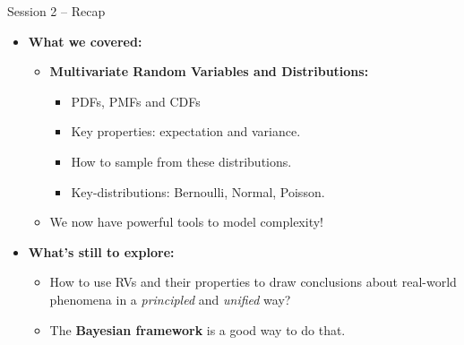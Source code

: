 \documentclass{beamer}
\begin{document}
\begin{frame}{Session 2 – Recap}
  \begin{itemize}
    \item \textbf{What we covered:}
    \begin{itemize}
      \item \textbf{Multivariate Random Variables and Distributions:}
      \begin{itemize}
        \item PDFs, PMFs and CDFs
        \item Key properties: expectation and variance.
        \item How to sample from these distributions.
        \item Key-distributions: Bernoulli, Normal, Poisson.
      \end{itemize}

      \item We now have powerful tools to model complexity!
    \end{itemize}

    \item \textbf{What’s still to explore:}
    \begin{itemize}
    \item How to use RVs and their properties to draw conclusions about real-world phenomena in a \textit{principled} and \textit{unified} way?
   \item The \textbf{Bayesian framework} is a good way to do that.
    \end{itemize}
  \end{itemize}
\end{frame}
\end{document}
